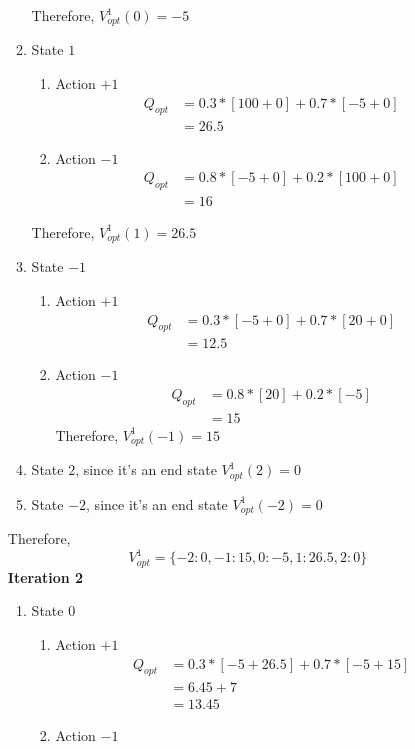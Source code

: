 \documentclass[12pt]{article}
\begin{document}
\begin{enumerate}[label=(\alph*)]
\begin{enumerate}
 	Therefore, $V_{opt}^1(0) = -5$
 	\item State $1$ \\
 	\begin{enumerate}
 		\item Action $+1$
 		\begin{align*}
 		Q_{opt} &= 0.3 * [100 + 0] + 0.7 * [-5 + 0] \\
 		&= 26.5
 		\end{align*}
 		\item Action $-1$
 		\begin{align*}
 		Q_{opt} &= 0.8 * [-5 + 0] + 0.2 * [100 + 0] \\
 		&= 16
 		\end{align*}
 	\end{enumerate}
 	Therefore, $V_{opt}^1(1) = 26.5$
 	\item State $-1$ \\
 	\begin{enumerate}
 		\item Action $+1$
 		\begin{align*}
 		Q_{opt} &= 0.3 * [-5 + 0] + 0.7 * [20 + 0] \\
 		&= 12.5
 		\end{align*}
 		\item Action $-1$
 		\begin{align*}
 		Q_{opt} &= 0.8 * [20] + 0.2 * [-5] \\
 		&= 15
 		\end{align*}
 		Therefore, $V_{opt}^1(-1) = 15$
 	\end{enumerate}
 	\item State $2$, since it's an end state $V_{opt}^1(2) = 0$
 	\item State $-2$, since it's an end state $V_{opt}^1(-2) = 0$
 \end{enumerate}
 Therefore,
 $$V_{opt}^1 = \{ -2:0, -1: 15, 0: -5, 1: 26.5, 2:0 \}$$
 \textbf{Iteration 2}
 \begin{enumerate}
 \item State $0$
 \begin{enumerate}
	\item Action $+1$
	 \begin{align*}
	 Q_{opt} &= 0.3 * [-5 + 26.5] + 0.7 * [-5 + 15] \\
	 &= 6.45 + 7 \\
	 &= 13.45
	 \end{align*} 
	 \item Action $-1$
	 \begin{align*}

\end{align*}
\end{enumerate}
\end{enumerate}
\end{enumerate}
\end{document}
